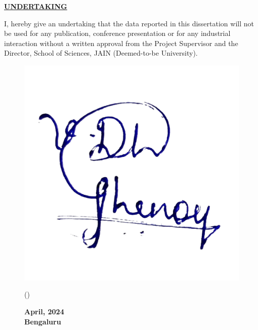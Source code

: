 
\thispagestyle{empty}

\begin{center}

    \Large{\underline{\textbf{UNDERTAKING}}}\\

\end{center}
\vspace{1.5cm}

\noindent
I, \textbf{\auth{}} hereby give an undertaking that the data
reported in this dissertation will not be used for any publication, conference
presentation or for any industrial interaction without a written approval from the Project
Supervisor and the Director, School of Sciences, JAIN (Deemed-to-be University).

\vspace{2cm}

\noindent
\begin{figure}[h!]
    \flushleft
    \hspace{0.5cm}
    \includegraphics[scale=0.125]{images/sign.png}
    \begin{minipage}{0.5\textwidth}
        \flushleft
        (\auth)

    \end{minipage}%
    \begin{minipage}{0.5\textwidth}
        \flushright

        \textbf{April, 2024\\
          Bengaluru}
    \end{minipage}
\end{figure}

